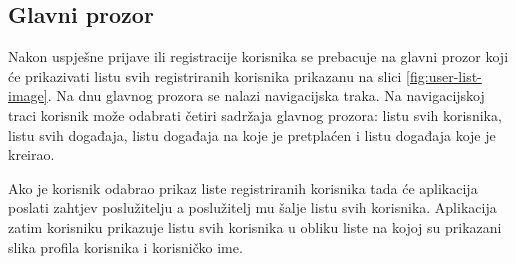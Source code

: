 \documentclass[times, utf8, zavrsni]{fer}
\begin{document}
\subsection{Glavni prozor}
Nakon uspješne prijave ili registracije korisnika se prebacuje na glavni prozor koji će prikazivati listu svih registriranih korisnika prikazanu na slici \ref{fig:user-list-image}. Na dnu glavnog prozora se nalazi navigacijska traka. Na navigacijskoj traci korisnik može odabrati četiri sadržaja glavnog prozora: listu svih korisnika, listu svih događaja, listu događaja na koje je pretplaćen i listu događaja koje je kreirao.

Ako je korisnik odabrao prikaz liste registriranih korisnika tada će aplikacija poslati zahtjev poslužitelju a poslužitelj mu šalje listu svih korisnika. Aplikacija zatim korisniku prikazuje listu svih korisnika u obliku liste na kojoj su prikazani slika profila korisnika i korisničko ime.
\end{document}
